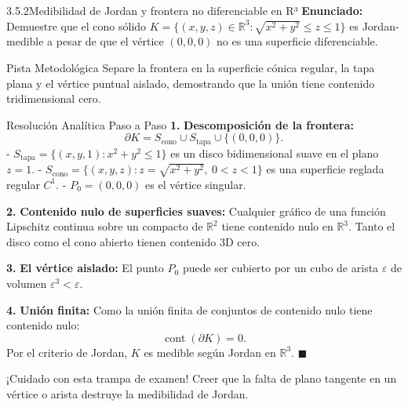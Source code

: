 \documentclass[11pt,a4paper]{article}
\begin{document}
\begin{nivelbox}{3.5.2}{Medibilidad de Jordan y frontera no diferenciable en R³}
\textbf{Enunciado:}\\
Demuestre que el cono sólido $K = \{ (x,y,z) \in \mathbb{R}^3 : \sqrt{x^2+y^2} \le z \le 1 \}$ es Jordan-medible a pesar de que el vértice $(0,0,0)$ no es una superficie diferenciable.

\begin{observacionbox}{Pista Metodológica}
Separe la frontera en la superficie cónica regular, la tapa plana y el vértice puntual aislado, demostrando que la unión tiene contenido tridimensional cero.
\end{observacionbox}

\begin{ejerciciobox}{Resolución Analítica Paso a Paso}
\smallskip\noindent\textbf{1.} \textbf{Descomposición de la frontera:}
\[\partial K = S_{\text{cono}} \cup S_{\text{tapa}} \cup \{(0,0,0)\}.\]
- $S_{\text{tapa}} = \{ (x,y,1) : x^2 + y^2 \le 1 \}$ es un disco bidimensional suave en el plano $z=1$.
- $S_{\text{cono}} = \{ (x,y,z) : z = \sqrt{x^2+y^2}, \ 0 < z < 1 \}$ es una superficie reglada regular $C^1$.
- $P_0 = (0,0,0)$ es el vértice singular.

\smallskip\noindent\textbf{2.} \textbf{Contenido nulo de superficies suaves:}
Cualquier gráfico de una función Lipschitz continua sobre un compacto de $\mathbb{R}^2$ tiene contenido nulo en $\mathbb{R}^3$. Tanto el disco como el cono abierto tienen contenido 3D cero.

\smallskip\noindent\textbf{3.} \textbf{El vértice aislado:}
El punto $P_0$ puede ser cubierto por un cubo de arista $\varepsilon$ de volumen $\varepsilon^3 < \varepsilon$.

\smallskip\noindent\textbf{4.} \textbf{Unión finita:}
Como la unión finita de conjuntos de contenido nulo tiene contenido nulo:
\[\operatorname{cont}(\partial K) = 0.\]
Por el criterio de Jordan, $K$ es medible según Jordan en $\mathbb{R}^3$. $\blacksquare$
\end{ejerciciobox}

\begin{errorbox}{¡Cuidado con esta trampa de examen!}
Creer que la falta de plano tangente en un vértice o arista destruye la medibilidad de Jordan.
\end{errorbox}
\end{nivelbox}
\bigskip
\end{document}
